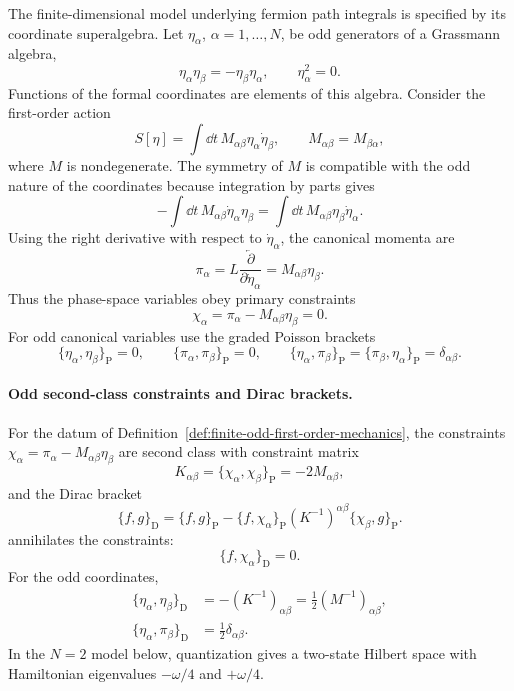 \begin{definition}
\label{def:finite-odd-first-order-mechanics}
The finite-dimensional model underlying fermion path integrals is specified
by its coordinate superalgebra. Let \(\eta_\alpha\), \(\alpha=1,\ldots,N\),
be odd generators of a Grassmann algebra,
\[
  \eta_\alpha\eta_\beta=-\eta_\beta\eta_\alpha,
  \qquad
  \eta_\alpha^2=0.
\]
Functions of the formal coordinates are elements of this algebra. Consider
the first-order action
\[
  S[\eta]
  =
  \int\dd t\,
  M_{\alpha\beta}\eta_\alpha\dot\eta_\beta,
  \qquad
  M_{\alpha\beta}=M_{\beta\alpha},
\]
where \(M\) is nondegenerate. The symmetry of \(M\) is compatible with the
odd nature of the coordinates because integration by parts gives
\[
  -\int\dd t\,M_{\alpha\beta}\dot\eta_\alpha\eta_\beta
  =
  \int\dd t\,M_{\alpha\beta}\eta_\beta\dot\eta_\alpha .
\]
Using the right derivative with respect to \(\dot\eta_\alpha\), the canonical
momenta are
\[
  \pi_\alpha
  =
  L\frac{\overleftarrow\partial}{\partial\dot\eta_\alpha}
  =
  M_{\alpha\beta}\eta_\beta .
\]
Thus the phase-space variables obey primary constraints
\[
  \chi_\alpha=\pi_\alpha-M_{\alpha\beta}\eta_\beta=0 .
\]
For odd canonical variables use the graded Poisson brackets
\[
  \{\eta_\alpha,\eta_\beta\}_{\mathrm P}=0,
  \qquad
  \{\pi_\alpha,\pi_\beta\}_{\mathrm P}=0,
  \qquad
  \{\eta_\alpha,\pi_\beta\}_{\mathrm P}
  =
  \{\pi_\beta,\eta_\alpha\}_{\mathrm P}
  =
  \delta_{\alpha\beta}.
\]
\end{definition}

\paragraph{Odd second-class constraints and Dirac brackets.}
For the datum of
Definition~\ref{def:finite-odd-first-order-mechanics}, the constraints
\(\chi_\alpha=\pi_\alpha-M_{\alpha\beta}\eta_\beta\) are second class with
constraint matrix
\[
  K_{\alpha\beta}
  =
  \{\chi_\alpha,\chi_\beta\}_{\mathrm P}
  =
  -2M_{\alpha\beta},
\]
and the Dirac bracket
\[
  \{f,g\}_{\mathrm D}
  =
  \{f,g\}_{\mathrm P}
  -
  \{f,\chi_\alpha\}_{\mathrm P}
  (K^{-1})^{\alpha\beta}
  \{\chi_\beta,g\}_{\mathrm P}.
\]
annihilates the constraints:
\[
  \{f,\chi_\alpha\}_{\mathrm D}=0.
\]
For the odd coordinates,
\[
\begin{aligned}
  \{\eta_\alpha,\eta_\beta\}_{\mathrm D}
  &=
  - (K^{-1})_{\alpha\beta}
   =
  \frac12(M^{-1})_{\alpha\beta},\\
  \{\eta_\alpha,\pi_\beta\}_{\mathrm D}
  &=
  \frac12\delta_{\alpha\beta}.
\end{aligned}
\]
In the \(N=2\) model below, quantization gives a two-state Hilbert space with
Hamiltonian eigenvalues \(-\omega/4\) and \(+\omega/4\).

